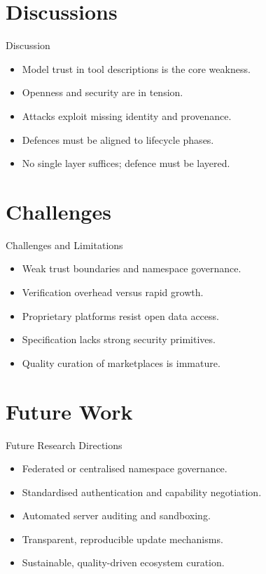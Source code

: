 \documentclass{beamer}
\begin{document}
\section{Discussions}
\begin{frame}{Discussion}
\begin{itemize}
  \item Model trust in tool descriptions is the core weakness.
  \item Openness and security are in tension.
  \item Attacks exploit missing identity and provenance.
  \item Defences must be aligned to lifecycle phases.
  \item No single layer suffices; defence must be layered.
\end{itemize}
\end{frame}

\section{Challenges}
\begin{frame}{Challenges and Limitations}
\begin{itemize}
  \item Weak trust boundaries and namespace governance.
  \item Verification overhead versus rapid growth.
  \item Proprietary platforms resist open data access.
  \item Specification lacks strong security primitives.
  \item Quality curation of marketplaces is immature.
\end{itemize}
\end{frame}

\section{Future Work}
\begin{frame}{Future Research Directions}
\begin{itemize}
  \item Federated or centralised namespace governance.
  \item Standardised authentication and capability negotiation.
  \item Automated server auditing and sandboxing.
  \item Transparent, reproducible update mechanisms.
  \item Sustainable, quality-driven ecosystem curation.
\end{itemize}
\end{frame}
\end{document}
